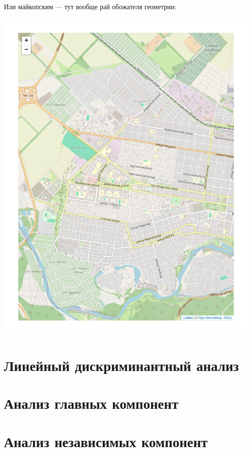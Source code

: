 \documentclass[
  letterpaper,
  DIV=11,
  numbers=noendperiod]{scrreprt}
\theoremstyle{definition}
\theoremstyle{remark}
\begin{document}
Или майкопским --- тут вообще рай обожателя геометрии:

\includegraphics{andan-cluster_files/figure-pdf/maikop-1.pdf}


\chapter{Линейный дискриминантный анализ}\label{andan-lda}


\chapter{Анализ главных компонент}\label{andan-pca}


\chapter{Анализ независимых компонент}\label{andan-ica}
\end{document}
